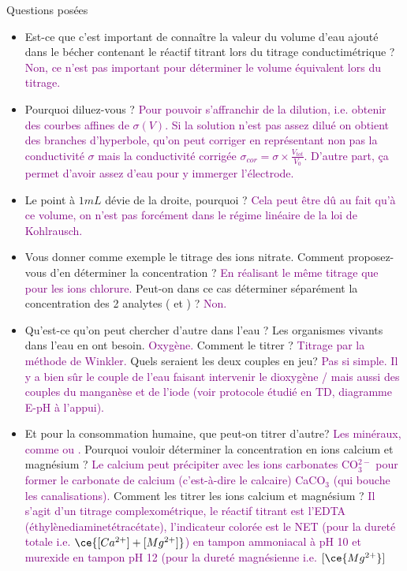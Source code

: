 \begin{reportBlock}{Questions posées}

\begin{itemize}

\item Est-ce que c'est important de connaître la valeur du volume d'eau ajouté dans le bécher contenant le réactif titrant lors du titrage conductimétrique ? \textcolor{purple}{Non, ce n'est pas important pour déterminer le volume équivalent lors du titrage.}

\item Pourquoi diluez-vous ?  \textcolor{purple}{Pour pouvoir s'affranchir de la dilution, i.e. obtenir des courbes affines de $\sigma(V)$. Si la solution n'est pas assez dilué on obtient des branches d'hyperbole, qu'on peut corriger en représentant non pas la conductivité $\sigma$ mais la conductivité corrigée $\sigma_{cor}=\sigma \times \frac{V_{tot}}{V_0}$. D'autre part, ça permet d'avoir assez d'eau pour y immerger l'électrode.}

\item Le point à $1mL$ dévie de la droite, pourquoi ? \textcolor{purple}{Cela peut être dû au fait qu'à ce volume, on n'est pas forcément dans le régime linéaire de la loi de Kohlrausch.}

\item Vous donner comme exemple le titrage des ions nitrate. Comment proposez-vous d'en déterminer la concentration ? \textcolor{purple}{En réalisant le même titrage que pour les ions chlorure.} Peut-on dans ce cas déterminer séparément la concentration des 2 analytes ( et ) ? \textcolor{purple}{Non.}

\item Qu'est-ce qu'on peut chercher d'autre dans l'eau ? Les organismes vivants dans l'eau en ont besoin. \textcolor{purple}{Oxygène.} Comment le titrer ? \textcolor{purple}{Titrage par la méthode de Winkler.} Quels seraient les deux couples en jeu? \textcolor{purple}{Pas si simple. Il y a bien sûr le couple de l'eau faisant intervenir le dioxygène / mais aussi des couples du manganèse et de l'iode (voir protocole étudié en TD, diagramme E-pH à l'appui).}

\item Et pour la consommation humaine, que peut-on titrer d'autre? \textcolor{purple}{Les minéraux, comme  ou .} Pourquoi vouloir déterminer la concentration en ions calcium et magnésium ? \textcolor{purple}{Le calcium peut précipiter avec les ions carbonates CO$_{3}^{2-}$ pour former le carbonate de calcium (c'est-à-dire le calcaire) CaCO$_3$ (qui bouche les canalisations).} Comment les titrer les ions calcium et magnésium ? \textcolor{purple}{Il s'agit d'un titrage complexométrique, le réactif titrant est l'EDTA (éthylènediaminetétracétate), l'indicateur colorée est le NET (pour la dureté totale i.e. $\ce{[Ca^{2+}]+[Mg^{2+}]}$) en tampon ammoniacal à pH 10 et murexide en tampon pH 12 (pour la dureté magnésienne i.e. $[\ce{Mg^{2+}}]$}


\end{itemize}
\end{reportBlock}
